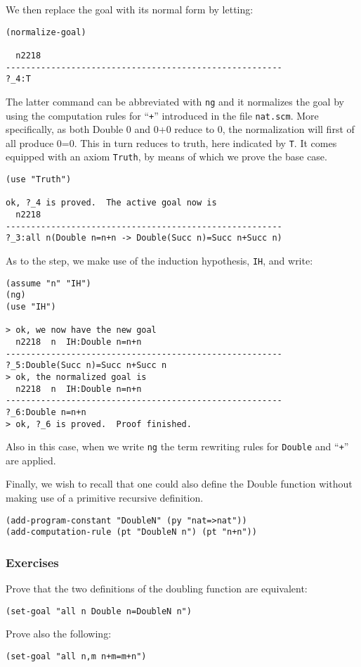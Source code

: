 \documentclass[12pt]{amsart}
\newcommand{\inquotes}[1]{``#1''}
\begin{document}
We then replace the goal with its normal form by letting:
\begin{verbatim}
(normalize-goal)

  n2218
-------------------------------------------------------
?_4:T
\end{verbatim}

The latter command can be abbreviated with \texttt{ng} and it
normalizes the goal by using the computation rules for
\inquotes{\texttt{+}} introduced in the file \texttt{nat.scm}.  More
specifically, as both Double 0 and 0+0 reduce to 0, the normalization
will first of all produce 0=0.  This in turn reduces to truth, here
indicated by \texttt{T}.  It comes equipped with an axiom
\texttt{Truth}, by means of which we prove the base case.
\begin{verbatim}
(use "Truth")

ok, ?_4 is proved.  The active goal now is
  n2218
-------------------------------------------------------
?_3:all n(Double n=n+n -> Double(Succ n)=Succ n+Succ n)

\end{verbatim}

As to the step, we make use of the induction hypothesis, \texttt{IH},
and write:
\begin{verbatim}
(assume "n" "IH")
(ng)
(use "IH")

> ok, we now have the new goal 
  n2218  n  IH:Double n=n+n
-------------------------------------------------------
?_5:Double(Succ n)=Succ n+Succ n
> ok, the normalized goal is
  n2218  n  IH:Double n=n+n
-------------------------------------------------------
?_6:Double n=n+n
> ok, ?_6 is proved.  Proof finished.
\end{verbatim}

Also in this case, when we write \texttt{ng} the term rewriting rules
for \texttt{Double} and \inquotes{\texttt{+}} are applied.

Finally, we wish to recall that one could also define the Double
function without making use of a primitive recursive definition.
\begin{verbatim}
(add-program-constant "DoubleN" (py "nat=>nat"))
(add-computation-rule (pt "DoubleN n") (pt "n+n"))
\end{verbatim}


\subsubsection{Exercises}
Prove that the two definitions of the doubling function are equivalent:
\begin{verbatim}
(set-goal "all n Double n=DoubleN n")
\end{verbatim}
Prove also the following:
\begin{verbatim}
(set-goal "all n,m n+m=m+n")
\end{verbatim}
\end{document}
